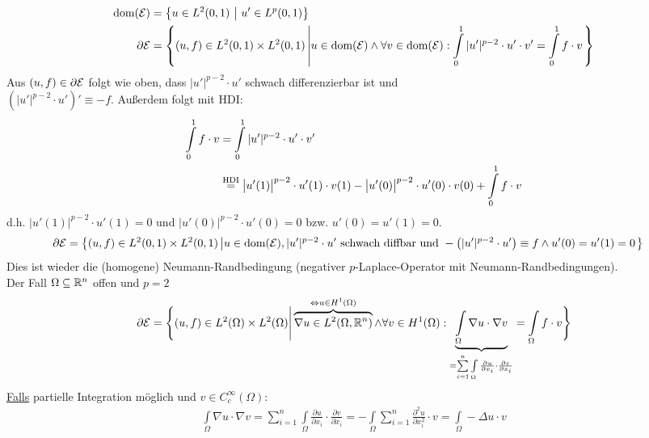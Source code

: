 \begin{beispiel}
\begin{align*}
\text{dom}(\mathcal{E})&=\big\lbrace u\in L^2(0,1)~\big|~u'\in L^p(0,1)\big\rbrace\\
\partial\mathcal{E}&=\left\lbrace(u,f)\in L^2(0,1)\times L^2(0,1)\left|u\in\text{dom}(\mathcal{E})\wedge\forall v\in\text{dom}(\mathcal{E}):\int\limits_0^1|u'|^{p-2}\cdot u'\cdot v'=\int\limits_0^1 f\cdot v\right.\right\rbrace
\end{align*}
Aus $(u,f)\in\partial\mathcal{E}$ folgt wie oben, dass $|u'|^{p-2}\cdot u'$ schwach differenzierbar ist und\\ $\left(|u'|^{p-2}\cdot u'\right)'\equiv -f$. Außerdem folgt mit HDI:
\begin{align*}
\int\limits_0^1 f\cdot v
&=\int\limits_0^1|u'|^{p-2}\cdot u'\cdot v'\\
&\stackrel{\text{HDI}}{=}
\big| u'(1)\big|^{p-2}\cdot u'(1)\cdot v(1)-
\big| u'(0)\big|^{p-2}\cdot u'(0)\cdot v(0)+\int\limits_0^1 f\cdot v
\end{align*}
d.h. $\big|u'(1)\big|^{p-2}\cdot u'(1)=0$ und $\big|u'(0)\big|^{p-2}\cdot u'(0)=0$ bzw. $u'(0)=u'(1)=0$.
\begin{align*}
\partial\mathcal{E}&=\left\lbrace(u,f)\in L^2(0,1)\times L^2(0,1)\left|u\in\text{dom}(\mathcal{E}),|u'|^{p-2}\cdot u'\text{ schwach diffbar und }-\left(|u'|^{p-2}\cdot u'\right)\equiv f\wedge u'(0)=u'(1)=0\right.\right\rbrace
\end{align*}
Dies ist wieder die (homogene) Neumann-Randbedingung (negativer $p$-Laplace-Operator mit Neumann-Randbedingungen).\\
Der Fall $\Omega\subseteq\mathbb{R}^n$ offen und $p=2$
\begin{align*}
\partial\mathcal{E}=\Bigg\lbrace(u,f)\in L^2(\Omega)\times L^2(\Omega)\Bigg|\overbrace{\nabla u\in L^2(\Omega,\mathbb{R}^n)}^{\Leftrightarrow u\in H^1(\Omega)}\wedge\forall v\in H^1(\Omega):\underbrace{\int\limits_\Omega\nabla u\cdot \nabla v}_{=\sum\limits_{i=1}^n\int\limits_\Omega\frac{\partial u}{\partial x_i}\cdot\frac{\partial v}{\partial x_i}}=\int\limits_\Omega f\cdot v\Bigg\rbrace
\end{align*}
\underline{Falls} partielle Integration möglich und $v\in C^\infty_c(\Omega)$:
\begin{align*}
\int\limits_\Omega\nabla u\cdot \nabla v=\sum\limits_{i=1}^n\int\limits_\Omega\frac{\partial u}{\partial x_i}\cdot\frac{\partial v}{\partial x_i}=-\int\limits_\Omega\sum\limits_{i=1}^n\frac{\partial^2 u}{\partial x_i^2}\cdot v
=\int\limits_\Omega-\Delta u\cdot v
\end{align*}
\end{beispiel}


